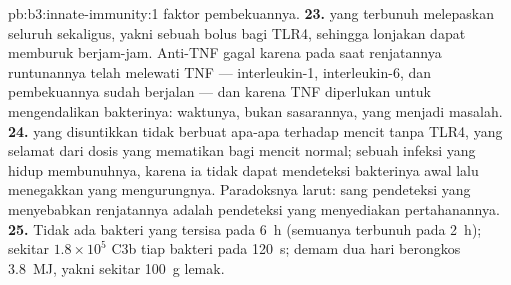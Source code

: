 \begin{solution}{pb:b3:innate-immunity:1}
faktor pembekuannya.
\textbf{23.}  yang terbunuh melepaskan seluruh 
sekaligus, yakni sebuah bolus bagi TLR4, sehingga lonjakan  dapat memburuk berjam-jam.
Anti-TNF gagal karena pada saat renjatannya runtunannya telah melewati TNF
--- interleukin-1, interleukin-6, dan pembekuannya sudah berjalan
--- dan karena TNF diperlukan untuk mengendalikan bakterinya: waktunya, bukan
sasarannya, yang menjadi masalah.
\textbf{24.}  yang disuntikkan tidak berbuat apa-apa terhadap
mencit tanpa TLR4, yang selamat dari dosis yang mematikan bagi mencit normal; sebuah infeksi
 yang hidup membunuhnya, karena ia tidak dapat mendeteksi bakterinya awal lalu
menegakkan  yang mengurungnya. Paradoksnya larut: sang
pendeteksi yang menyebabkan renjatannya adalah pendeteksi yang menyediakan
pertahanannya.
\textbf{25.} Tidak ada bakteri yang tersisa pada \qty{6}{h} (semuanya terbunuh pada \qty{2}{h});
sekitar $1.8\times 10^{5}$ C3b tiap bakteri pada \qty{120}{s}; demam dua hari
berongkos \qty{3.8}{MJ}, yakni sekitar \qty{100}{g} lemak.
\end{solution}
